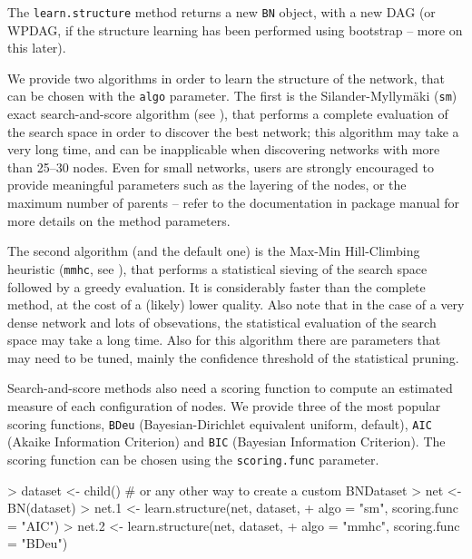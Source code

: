 \documentclass{article}
\newcommand{\Robject}[1]{{\texttt{#1}}}
\newcommand{\Rmethod}[1]{{\texttt{#1}}}
\begin{document}
The \Rmethod{learn.structure} method returns a new \Robject{BN} object, with a new DAG (or WPDAG, if the structure
learning has been performed using bootstrap -- more on this later).

We provide two algorithms in order to learn the structure of the network, that can be chosen with the \texttt{algo} parameter.
The first is the Silander-Myllym\"aki (\texttt{sm})
exact search-and-score algorithm (see \citet*{silander2012simple}), that performs a complete evaluation of the search space in order to discover
the best network; this algorithm may take a very long time, and can be inapplicable when discovering networks
with more than 25--30 nodes. Even for small networks, users are strongly encouraged to provide
meaningful parameters such as the layering of the nodes, or the maximum number of parents -- refer to the 
documentation in package manual for more details on the method parameters.

The second algorithm (and the default one) is the Max-Min Hill-Climbing heuristic (\texttt{mmhc}, see \citet*{tsamardinos2006max}), that performs a statistical
sieving of the search space followed by a greedy evaluation. It is considerably faster than the complete method, at the cost of a (likely)
lower quality. Also note that in the case of a very dense network and lots of obsevations, the statistical evaluation
of the search space may take a long time. Also for this algorithm there are parameters that may need to be tuned,
mainly the confidence threshold of the statistical pruning.

Search-and-score methods also need a scoring function to compute an estimated measure of each configuration of nodes.
We provide three of the most popular scoring functions, \texttt{BDeu} (Bayesian-Dirichlet equivalent uniform, default),
\texttt{AIC} (Akaike Information Criterion) and \texttt{BIC} (Bayesian Information Criterion). The scoring function
can be chosen using the \texttt{scoring.func} parameter.

\begin{Schunk}
\begin{Sinput}
> dataset <- child() # or any other way to create a custom BNDataset
> net     <- BN(dataset)
> net.1   <- learn.structure(net, dataset,
+                            algo = "sm", scoring.func = "AIC")
> net.2   <- learn.structure(net, dataset,
+                            algo = "mmhc", scoring.func = "BDeu")
\end{Sinput}
\end{Schunk}
\end{document}
